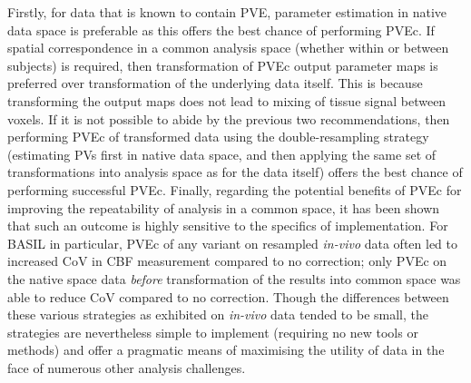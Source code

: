 Firstly, for data that is known to contain PVE, parameter estimation in native data space is preferable as this offers the best chance of performing PVEc. If spatial correspondence in a common analysis space (whether within or between subjects) is required, then transformation of PVEc output parameter maps is preferred over transformation of the underlying data itself. This is because transforming the output maps does not lead to mixing of tissue signal between voxels. If it is not possible to abide by the previous two recommendations, then performing PVEc of transformed data using the double-resampling strategy (estimating PVs first in native data space, and then applying the same set of transformations into analysis space as for the data itself) offers the best chance of performing successful PVEc. Finally, regarding the potential benefits of PVEc for improving the repeatability of analysis in a common space, it has been shown that such an outcome is highly sensitive to the specifics of implementation. For BASIL in particular, PVEc of any variant on resampled \textit{in-vivo} data often led to increased CoV in CBF measurement compared to no correction; only PVEc on the native space data \textit{before} transformation of the results into common space was able to reduce CoV compared to no correction. Though the differences between these various strategies as exhibited on \textit{in-vivo} data tended to be small, the strategies are nevertheless simple to implement (requiring no new tools or methods) and offer a pragmatic means of maximising the utility of data in the face of numerous other analysis challenges. 

